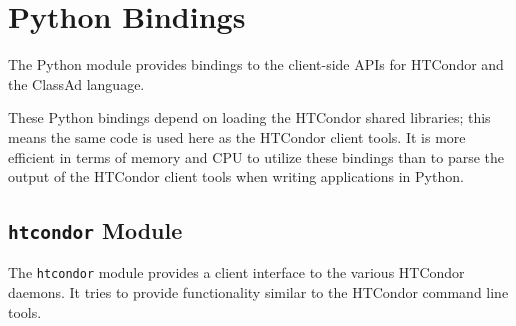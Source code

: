 \section{Python Bindings}\label{API-Python}

The Python module provides bindings to the client-side APIs for HTCondor and
the ClassAd language.

These Python bindings depend on loading the HTCondor shared libraries; this
means the same code is used here as the HTCondor client tools.  It is more
efficient in terms of memory and CPU to utilize these bindings than to parse
the output of the HTCondor client tools when writing applications in Python.

\subsection{\label{Python-OtherModule} \texttt{htcondor}  Module}
The \texttt{htcondor} module provides a client interface to the various 
HTCondor daemons. It tries to provide functionality similar to the HTCondor 
command line tools.

